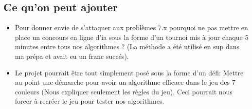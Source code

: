 \documentclass{article}
\begin{document}
    \subsection*{Ce qu'on peut ajouter}
    \begin{itemize}
    \item Pour donner envie de s'attaquer aux problèmes 7.x pourquoi ne pas mettre en place un concours en ligne d'ia sous la forme d'un tournoi mis à jour chaque 5 minutes entre tous nos algorithmes ? (La méthode a été utilisé en sup dans ma prépa et avait eu un franc succés).

    \item Le projet pourrait être tout simplement posé sous la forme d'un défi: Mettre au point une démarche pour avoir un algorithme efficace dans le jeu des 7 couleurs (Nous expliquer seulement les règles du jeu). Ceci pourrait nous forcer à recréer le jeu pour tester nos algorithmes.


    \end{itemize}
\end{document}
